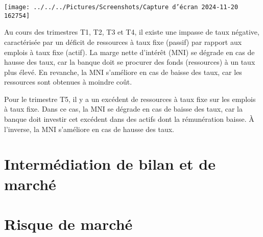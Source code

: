 \documentclass[a4paper, 12pt]{report}
\begin{document}
\begin{center}
	\texttt{[image: ../../../Pictures/Screenshots/Capture d'écran 2024-11-20 162754]}
\end{center}

Au cours des trimestres T1, T2, T3 et T4, il existe une impasse de taux négative, caractérisée par un déficit de ressources à taux fixe (passif) par rapport aux emplois à taux fixe (actif). La marge nette d'intérêt (MNI) se dégrade en cas de hausse des taux, car la banque doit se procurer des fonds (ressources) à un taux plus élevé. En revanche, la MNI s’améliore en cas de baisse des taux, car les ressources sont obtenues à moindre coût.

Pour le trimestre T5, il y a un excédent de ressources à taux fixe sur les emplois à taux fixe. Dans ce cas, la MNI se dégrade en cas de baisse des taux, car la banque doit investir cet excédent dans des actifs dont la rémunération baisse. À l'inverse, la MNI s’améliore en cas de hausse des taux.

\section{Intermédiation de bilan et de marché}


\section{Risque de marché}
\end{document}
